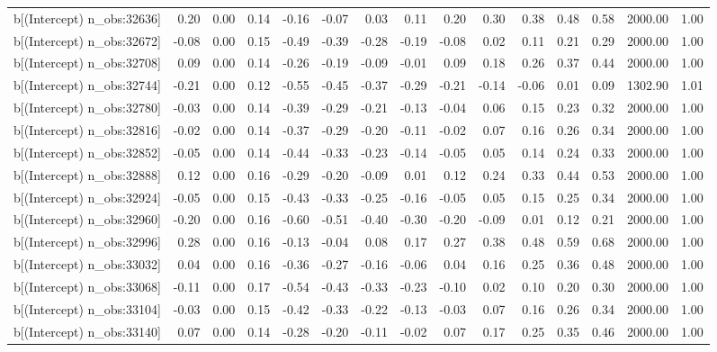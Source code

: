 \begin{table}[ht]
\begin{tabular}{rrrrrrrrrrrrrrr}
  b[(Intercept) n\_obs:32636] & 0.20 & 0.00 & 0.14 & -0.16 & -0.07 & 0.03 & 0.11 & 0.20 & 0.30 & 0.38 & 0.48 & 0.58 & 2000.00 & 1.00 \\ 
  b[(Intercept) n\_obs:32672] & -0.08 & 0.00 & 0.15 & -0.49 & -0.39 & -0.28 & -0.19 & -0.08 & 0.02 & 0.11 & 0.21 & 0.29 & 2000.00 & 1.00 \\ 
  b[(Intercept) n\_obs:32708] & 0.09 & 0.00 & 0.14 & -0.26 & -0.19 & -0.09 & -0.01 & 0.09 & 0.18 & 0.26 & 0.37 & 0.44 & 2000.00 & 1.00 \\ 
  b[(Intercept) n\_obs:32744] & -0.21 & 0.00 & 0.12 & -0.55 & -0.45 & -0.37 & -0.29 & -0.21 & -0.14 & -0.06 & 0.01 & 0.09 & 1302.90 & 1.01 \\ 
  b[(Intercept) n\_obs:32780] & -0.03 & 0.00 & 0.14 & -0.39 & -0.29 & -0.21 & -0.13 & -0.04 & 0.06 & 0.15 & 0.23 & 0.32 & 2000.00 & 1.00 \\ 
  b[(Intercept) n\_obs:32816] & -0.02 & 0.00 & 0.14 & -0.37 & -0.29 & -0.20 & -0.11 & -0.02 & 0.07 & 0.16 & 0.26 & 0.34 & 2000.00 & 1.00 \\ 
  b[(Intercept) n\_obs:32852] & -0.05 & 0.00 & 0.14 & -0.44 & -0.33 & -0.23 & -0.14 & -0.05 & 0.05 & 0.14 & 0.24 & 0.33 & 2000.00 & 1.00 \\ 
  b[(Intercept) n\_obs:32888] & 0.12 & 0.00 & 0.16 & -0.29 & -0.20 & -0.09 & 0.01 & 0.12 & 0.24 & 0.33 & 0.44 & 0.53 & 2000.00 & 1.00 \\ 
  b[(Intercept) n\_obs:32924] & -0.05 & 0.00 & 0.15 & -0.43 & -0.33 & -0.25 & -0.16 & -0.05 & 0.05 & 0.15 & 0.25 & 0.34 & 2000.00 & 1.00 \\ 
  b[(Intercept) n\_obs:32960] & -0.20 & 0.00 & 0.16 & -0.60 & -0.51 & -0.40 & -0.30 & -0.20 & -0.09 & 0.01 & 0.12 & 0.21 & 2000.00 & 1.00 \\ 
  b[(Intercept) n\_obs:32996] & 0.28 & 0.00 & 0.16 & -0.13 & -0.04 & 0.08 & 0.17 & 0.27 & 0.38 & 0.48 & 0.59 & 0.68 & 2000.00 & 1.00 \\ 
  b[(Intercept) n\_obs:33032] & 0.04 & 0.00 & 0.16 & -0.36 & -0.27 & -0.16 & -0.06 & 0.04 & 0.16 & 0.25 & 0.36 & 0.48 & 2000.00 & 1.00 \\ 
  b[(Intercept) n\_obs:33068] & -0.11 & 0.00 & 0.17 & -0.54 & -0.43 & -0.33 & -0.23 & -0.10 & 0.02 & 0.10 & 0.20 & 0.30 & 2000.00 & 1.00 \\ 
  b[(Intercept) n\_obs:33104] & -0.03 & 0.00 & 0.15 & -0.42 & -0.33 & -0.22 & -0.13 & -0.03 & 0.07 & 0.16 & 0.26 & 0.34 & 2000.00 & 1.00 \\ 
  b[(Intercept) n\_obs:33140] & 0.07 & 0.00 & 0.14 & -0.28 & -0.20 & -0.11 & -0.02 & 0.07 & 0.17 & 0.25 & 0.35 & 0.46 & 2000.00 & 1.00 \\ 

\end{tabular}
\end{table}

